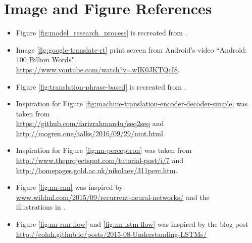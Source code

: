 
\chapter{Image and Figure References}


\begin{itemize}
    \item Figure \ref{fig:model_research_process} is recreated from \citep{oates2005researching}.
    \item Image \ref{fig:google-translate-rt} print screen from Android's video ``Android: 100 Billion Words".\\ \url{https://www.youtube.com/watch?v=wIK0JKTQcI8}.
    \item Figure \ref{fig:translation-phrase-based} is recreated from \citep{koehn2010statistical}.
    \item Inspiration for Figure \ref{fig:machine-translation-encoder-decoder-simple} was taken from \\ \url{https://github.com/farizrahman4u/seq2seq} and\\\url{http://mogren.one/talks/2016/09/29/nmt.html}
    \item Inspiration for Figure \ref{fig:nn-perceptron} was taken from\\\url{http://www.theprojectspot.com/tutorial-post/i/7} and \\ \url{http://homepages.gold.ac.uk/nikolaev/311perc.htm}.
    \item Figure \ref{fig:nn-rnn} was inspired by \\ \url{www.wildml.com/2015/09/recurrent-neural-networks/} and the\\ illustrations in \citep{goodfellow2016deeplearning}.
    \item Figure \ref{fig:nn-rnn-flow} and \ref{fig:nn-lstm-flow} was inspired by the blog post \\ \url{http://colah.github.io/posts/2015-08-Understanding-LSTMs/}
\end{itemize}